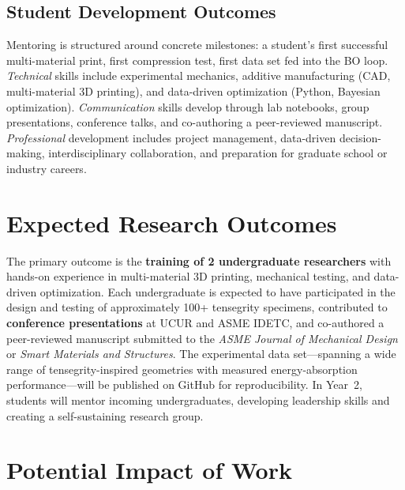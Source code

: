\documentclass[11pt]{article}
\begin{document}
\subsection*{Student Development Outcomes}

Mentoring is structured around concrete milestones:
a student's first successful multi-material print, first compression test,
first data set fed into the BO loop.  \emph{Technical} skills include
experimental mechanics, additive manufacturing (CAD, multi-material 3D printing),
and data-driven optimization (Python, Bayesian optimization).
\emph{Communication} skills develop through lab notebooks, group presentations,
conference talks, and co-authoring a peer-reviewed manuscript.
\emph{Professional} development includes project management, data-driven
decision-making, interdisciplinary collaboration, and preparation for graduate
school or industry careers.

\section{Expected Research Outcomes}

The primary outcome is the \textbf{training of 2 undergraduate
researchers} with hands-on experience in multi-material 3D printing, mechanical
testing, and data-driven optimization. Each undergraduate is expected to have
participated in the design and testing of approximately 100+ tensegrity
specimens, contributed to \textbf{conference presentations} at UCUR
and ASME IDETC, and co-authored a peer-reviewed manuscript
submitted to the \emph{ASME Journal of Mechanical Design} or \emph{Smart
Materials and Structures}. The
experimental data set---spanning a wide range of tensegrity-inspired geometries
with measured energy-absorption performance---will be published on GitHub
for reproducibility.  In Year~2, students will
mentor incoming undergraduates, developing leadership skills and creating a
self-sustaining research group.

\section{Potential Impact of Work}
\end{document}
